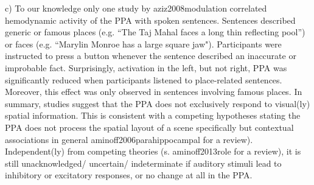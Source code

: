 \documentclass[english]{article}
\begin{document}
c) To our knowledge only one study by {aziz2008modulation} correlated hemodynamic activity of the PPA with spoken sentences. Sentences described generic or famous places (e.g. “The Taj Mahal faces a long thin reflecting pool”) or faces  (e.g. “Marylin Monroe has a large square jaw"). Participants were instructed to press a button whenever the sentence described an inaccurate or improbable fact. Surprisingly, activation in the left, but not right, PPA was significantly reduced  when participants listened to place-related sentences. Moreover, this effect was only observed in sentences involving famous places. 
In summary, studies suggest that the PPA does not exclusively respond to visual(ly) spatial information. This is consistent with a competing hypotheses stating the PPA does not process the spatial layout of a scene specifically but contextual associations in general {aminoff2006parahippocampal} for a review). Independent(ly) from competing theories (s. {aminoff2013role} for a review), it is still unacknowledged/ uncertain/ indeterminate if auditory stimuli lead to inhibitory or excitatory responses, or no change at all in the PPA.
\end{document}
